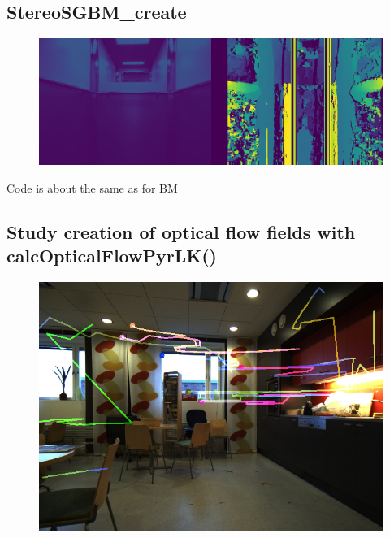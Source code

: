 \documentclass{article}
\begin{document}
\subsection{StereoSGBM\_create}
\begin{figure}[h]
    \centering
    \includegraphics[scale=0.30]{SGBM}
\end{figure}
Code is about the same as for BM
\subsection{Study creation of optical flow fields with calcOpticalFlowPyrLK()}
\begin{figure}[h]
    \centering
    \includegraphics[scale=0.60]{optical_flow_pyrlk}
\end{figure}
\end{document}
